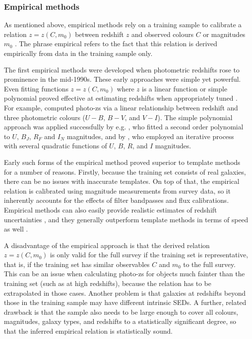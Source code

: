 \subsubsection{Empirical methods}\label{subsubsection:empirical_methods}
As mentioned above, empirical methods rely on a training sample to  calibrate a relation $z=z(C,m_{0})$ between redshift $z$ and observed colours $C$ or magnitudes $m_{0}$ \citep{2000ApJ...536..571B}. The phrase empirical refers to the fact that this relation is derived empirically from data in the training sample  only. \par 

The first empirical methods were developed when photometric redshifts rose to prominence in the mid-1990s. These early approaches were simple yet powerful. Even fitting functions $z=z(C,m_{0})$ where $z$ is a linear function or simple polynomial proved effective at estimating redshifts when appropriately tuned \citep{1995AJ....110.2655C}. For example, \cite{1998AJ....116.2081W} computed photo-zs via a linear relationship between redshift and three photometric colours ($U-B$, $B-V$, and $V-I$). The simple polynomial approach was applied successfully by e.g. \cite{1995AJ....110.2655C}, who fitted a second order polynomial to $U$, $B_{J}$, $R_{F}$ and $I_{N}$ magnitudes, and by \cite{1997ApJ...482L..21B}, who employed an iterative process with several quadratic functions of $U$, $B$, $R$, and $I$ magnitudes. \par

Early such forms of the empirical method proved superior to template methods \citep{2011Ap&SS.331....1W} for a number of reasons. Firstly, because the training set consists of real galaxies, there can be no issues with inaccurate templates. On top of that, the empirical relation is calibrated using magnitude measurements from survey data, so it inherently accounts for the effects of filter bandpasses and flux calibrations. Empirical methods can also easily provide realistic estimates of redshift uncertainties \citep{2011Ap&SS.331....1W}, and they generally outperform template methods in terms of speed as well \citep{2004A&A...423..761V,2019NatAs...3..212S}.  \par

A disadvantage of the empirical approach is that the derived relation $z=z(C,m_{0})$ is only valid for the full survey if the training set is representative, that is, if the training set has similar observables $C$ and $m_{0}$ to the full survey. This can be an issue when calculating photo-zs for objects much fainter than the training set (such as at high redshifts), because the relation has to be extrapolated in those cases.  Another problem is that galaxies at redshifts beyond those in the training sample may have different intrinsic SEDs. A further,  related drawback is that the sample also needs to be large enough to cover all colours, magnitudes, galaxy types, and redshifts to a statistically significant degree, so that the inferred empirical relation is statistically sound. \par

